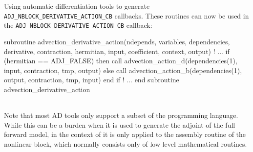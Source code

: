 \begin{boxwithtitle}{Using automatic differentiation tools to generate \texttt{ADJ_NBLOCK_DERIVATIVE_ACTION_CB} callbacks.}
These routines can now be used in the \texttt{ADJ_NBLOCK_DERIVATIVE_ACTION_CB} callback:
\\

\begin{minipage}{\columnwidth}
\begin{fortrancode}
  subroutine advection_derivative_action(ndepends, variables, dependencies, 
                                         derivative, contraction, hermitian, 
                                         input, coefficient, context, output)
    ! ...
    if (hermitian == ADJ_FALSE) then
      call advection_action_d(dependencies(1), input, contraction, tmp, output)
    else
      call advection_action_b(dependencies(1), output, contraction, tmp, input)
    end if
    ! ...
  end subroutine advection_derivative_action
\end{fortrancode}
\end{minipage}
\\

Note that most AD tools only support a subset of the programming language. 
While this can be a burden when it is used to generate the adjoint of the full forward model,
in the context of \libadjoint it is only applied to the assembly routine of the nonlinear block, which normally consists only of low level mathematical routines.
 
\end{boxwithtitle}

